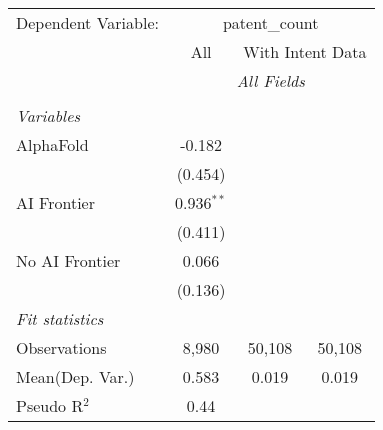 \begingroup
\centering
\begin{tabular}{lccc}
   \tabularnewline \midrule \midrule
   Dependent Variable: & \multicolumn{3}{c}{patent\_count}\\
 & \multicolumn{1}{c}{All} & \multicolumn{2}{c}{With Intent Data} \\
\cmidrule(lr){2-2} \cmidrule(lr){3-4}
 & \multicolumn{3}{c}{\textit{All Fields}} \\ \\
   \emph{Variables}\\
   AlphaFold      & -0.182       &        &   \\   
                  & (0.454)      &        &   \\   
   AI Frontier    & 0.936$^{**}$ &        &   \\   
                  & (0.411)      &        &   \\   
   No AI Frontier & 0.066        &        &   \\   
                  & (0.136)      &        &   \\   
   \midrule
   \emph{Fit statistics}\\
   Observations   & 8,980        & 50,108 & 50,108\\  
Mean(Dep. Var.) & 0.583 & 0.019 & 0.019 \\
   Pseudo R$^2$   & 0.44         &        & \\  
   

\end{tabular}
